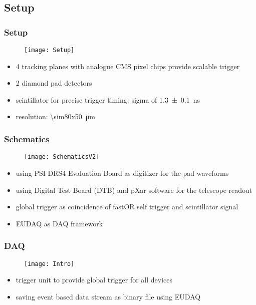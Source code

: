\subsection{Setup}
\begin{frame}
	\frametitle{Setup}
	\begin{figure}
		\centering
		\texttt{[image: Setup]}
	\end{figure}
	\begin{itemize}
		\setlength{\itemsep}{\fill}
		\item 4 tracking planes with analogue CMS pixel chips \ra provide scalable trigger
		\item 2 diamond pad detectors
		\item scintillator for precise trigger timing: sigma of \SI{1.3\pm.1}{ns}
		\item resolution: \SI{\sim80x50}{\micro\meter}
	\end{itemize}
\end{frame}
\begin{frame}
	\frametitle{Schematics}
	\begin{figure}
		\centering
		\texttt{[image: SchematicsV2]}
	\end{figure}
	\begin{itemize}
		\setlength{\itemsep}{\fill}
		\item using PSI DRS4 Evaluation Board as digitizer for the pad waveforms
		\item using Digital Test Board (DTB) and pXar software for the telescope readout
		\item global trigger as coincidence of fastOR self trigger and scintillator signal
		\item EUDAQ as DAQ framework
	\end{itemize}
\end{frame}
\begin{frame}
	\frametitle{DAQ}
	\begin{figure}
		\centering
		\texttt{[image: Intro]}
	\end{figure}
	\begin{itemize}
		\item trigger unit to provide global trigger for all devices
		\item saving event based data stream as binary file using EUDAQ
	\end{itemize}
\end{frame}
